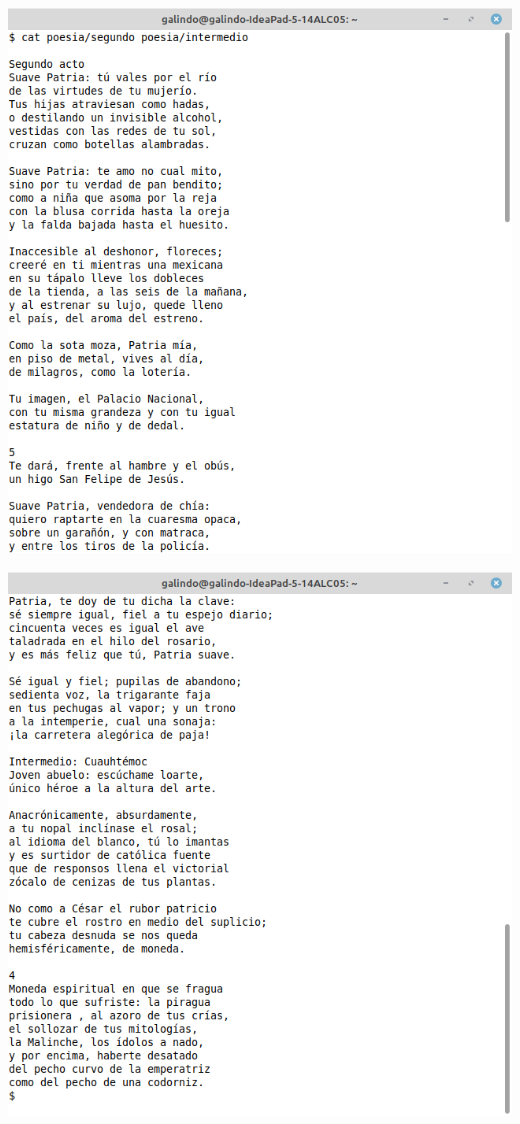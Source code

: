 \documentclass[11pt]{article}
\begin{document}
\begin{twoc}
\begin{center}
\includegraphics[width=.9\linewidth]{img/1.png}
\end{center}
\end{twoc}
\begin{twoc}
\begin{center}
\includegraphics[width=.9\linewidth]{img/2.png}
\end{center}
\end{twoc}
\end{document}
